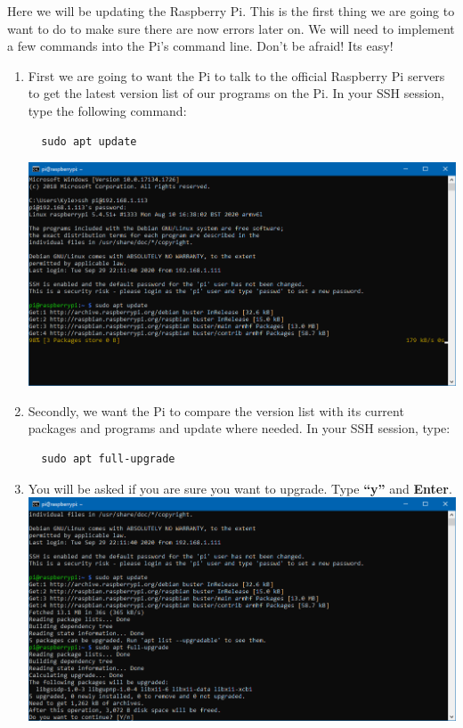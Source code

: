 \documentclass{article}
\begin{document}
Here we will be updating the Raspberry Pi. This is the first thing we are going to want to do to make sure there are now errors later on. We will need to implement a few commands into the Pi's command line. Don't be afraid! Its easy!

\begin{enumerate}
  \item First we are going to want the Pi to talk to the official Raspberry Pi servers to get the latest version list of our programs on the Pi. In your SSH session, type the following command:
  \begin{lstlisting} 
  sudo apt update
  \end{lstlisting}
  \includegraphics[width=1.00\textwidth]{aptupdate}
  \item Secondly, we want the Pi to compare the version list with its current packages and programs and update where needed. In your SSH session, type:
  \begin{lstlisting}
  sudo apt full-upgrade
  \end{lstlisting}
  \item You will be asked if you are sure you want to upgrade. Type \textbf{``y''} and \textbf{Enter}.
  \newline
  \newline
  \includegraphics[width=1.00\textwidth]{aptupgradecont}

\end{enumerate}
\end{document}
